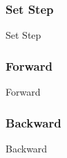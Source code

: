 \subsubsection{Set Step}
\begin{usecase}{Set Step}
    \precondition{
	    
    }
    \postconditions{
	    \item 
	    \item 
    }
    \mainsuccess{
	    \item 
    }
    \extensions{
	    \item[1.a]
		    \begin{enumerate}
			\item 
		    \end{enumerate}
    }
\end{usecase}
\newpage 
% 
\subsubsection{Forward}
\begin{usecase}{Forward}
    \precondition{
	    
    }
    \postconditions{
	    \item 
	    \item 
    }
    \mainsuccess{
	    \item 
    }
    \extensions{
	    \item[1.a]
		    \begin{enumerate}
			\item 
		    \end{enumerate}
    }
\end{usecase}
\newpage 
% 
\subsubsection{Backward}
\begin{usecase}{Backward}
    \precondition{
	    
    }
    \postconditions{
	    \item 
	    \item 
    }
    \mainsuccess{
	    \item 
    }
    \extensions{
	    \item[1.a]
		    \begin{enumerate}
			\item 
		    \end{enumerate}
    }
\end{usecase}
\newpage 
% 
